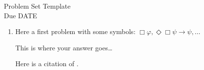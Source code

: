 \documentclass[12pt]{article}
\newcommand{\answer}[1]{%
  \par\noindent
  \begin{tcolorbox}[colback=gray!10, colframe=gray!80, title=Proof]
    #1
  \end{tcolorbox}
}
\begin{document}
\thispagestyle{empty}

\begin{center}
  \Large Problem Set Template\\[1ex] 
  Due DATE
  \vspace{.15in}
\end{center}



\begin{enumerate}[leftmargin=.75in]
  \item Here a first problem with some symbols: $\Box\varphi, \Diamond\Box\psi \rightarrow \psi,\ldots$
    \answer{
      This is where your answer goes\ldots

      Here is a citation of \cite{Lewis1912}.
    }
\end{enumerate}



\vfill
\begin{small} %
  \singlespacing %
  \setlength{\bibsep}{0.5pt} %
  \thispagestyle{empty} %
\end{small} %
\end{document}
